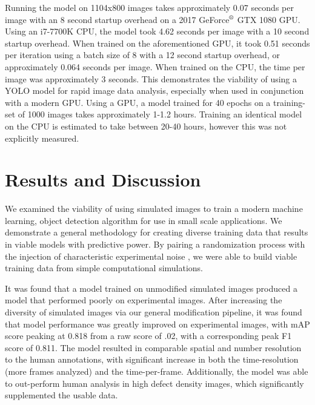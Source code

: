 \documentclass[prl,reprint,showpacs,floatfix,nofootinbib]{revtex4-1}
\begin{document}
Running the model on 1104x800 images takes approximately 0.07 seconds per image with an 8 second startup overhead on a 2017 GeForce$^{\tiny{\text{\textregistered}}}$ GTX 1080 GPU. Using an i7-7700K CPU, the model took 4.62 seconds per image with a 10 second startup overhead. When trained on the aforementioned GPU, it took 0.51 seconds per iteration using a batch size of 8 with a 12 second startup overhead, or approximately 0.064 seconds per image. When trained on the CPU, the time per image was approximately 3 seconds.   %
This demonstrates the viability of using a YOLO model for rapid image data analysis, especially when used in conjunction with a modern GPU. Using a GPU, a model trained for 40 epochs on a training-set of 1000 images takes approximately 1-1.2 hours.
Training an identical model on the CPU is estimated to take between 20-40 hours, however this was not explicitly measured.

\section{Results and Discussion}
We examined the viability of using simulated images to train a modern machine learning, object detection algorithm for use in small scale applications. We demonstrate a general methodology for creating diverse training data that results in viable models with predictive power. By pairing a randomization process with the injection of characteristic experimental noise , we were able to build viable training data from simple computational simulations. 

It was found that a model trained on unmodified simulated images produced a model that performed poorly on experimental images. After increasing the diversity of simulated images via our general modification pipeline, it was found that model performance was greatly improved on experimental images, with mAP score peaking at 0.818 from a raw score of .02, with a corresponding peak F1 score of 0.811.
The model resulted in comparable spatial and number resolution to the human annotations, with significant increase in both the time-resolution (more frames analyzed) and the time-per-frame. Additionally, the model was able to out-perform human analysis in high defect density images, which significantly supplemented the usable data.
\end{document}
